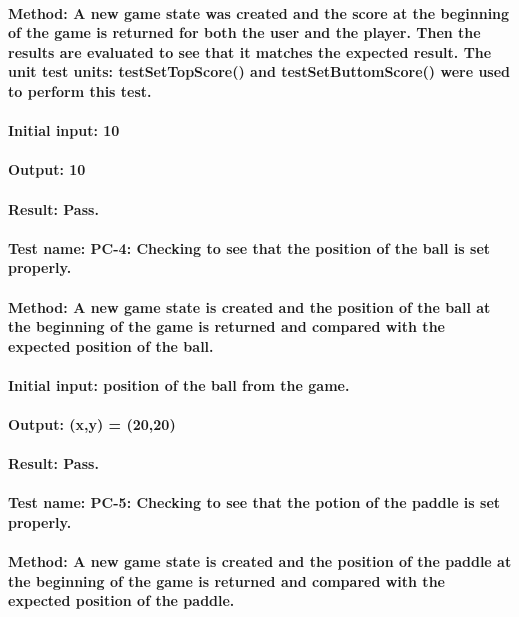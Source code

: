 \documentclass[12pt, titlepage]{article}
\begin{document}
\paragraph {Method: A new game state was created and the score at the beginning of the game is returned for both the user and the player. Then the results are evaluated to see that it matches the expected result. The unit test units: testSetTopScore() and testSetButtomScore() were used to perform this test.}
\paragraph {Initial input:  10}
\paragraph {Output: 10}
\paragraph {Result: Pass.}

\paragraph {Test name: PC-4: Checking to see that the position of the ball is set properly.}
\paragraph {Method: A new game state is created and the position of the ball at the beginning of the game is returned and compared with the expected position of the ball.}
\paragraph {Initial input: position of the ball from the game.}
\paragraph {Output: (x,y) = (20,20)}
\paragraph {Result: Pass.}

\paragraph {Test name: PC-5: Checking to see that the potion of the paddle is set properly.}
\paragraph {Method: A new game state is created and the position of the paddle at the beginning of the game is returned and compared with the expected position of the paddle. }
\end{document}
